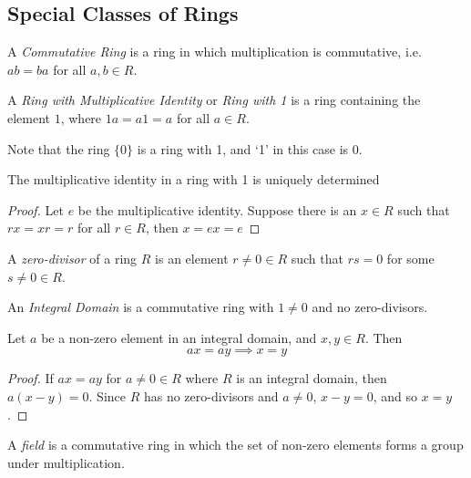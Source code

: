   \subsection{Special Classes of Rings}

  \begin{Def}
    A \emph{Commutative Ring} is a ring in which multiplication is commutative,
    i.e. $ab = ba$ for all $a, b \in R$.
  \end{Def}

  \begin{Def}
    A \emph{Ring with Multiplicative Identity} or \emph{Ring with 1} is
    a ring containing the element $1$, where $1a = a1 = a$ for all
    $a \in R$.
  \end{Def}

  Note that the ring $\lbrace 0 \rbrace$ is a ring with 1, and `1' in this case is $0$.

  \begin{Lemma}
    The multiplicative identity in a ring with 1 is uniquely determined
  \end{Lemma}
  \begin{proof}
    Let $e$ be the multiplicative identity. Suppose there is an $x \in R$ such
    that $rx = xr = r$ for all $r \in R$, then $x = ex = e$
  \end{proof}

  \begin{Def}
    A \emph{zero-divisor} of a ring $R$ is an element $r \neq 0 \in R$ such
    that $rs = 0$ for some $s \neq 0 \in R$.
  \end{Def}

  \begin{Def}
    An \emph{Integral Domain} is a commutative ring with $1 \neq 0$ and no zero-divisors.
  \end{Def}

  \begin{Lemma}
    Let $a$ be a non-zero element in an integral domain, and $x, y \in R$. Then
    $$ax = ay \implies x = y$$
  \end{Lemma}

  \begin{proof}
    If $ax = ay$ for $a \neq 0 \in R$ where $R$ is an integral domain, then
    $a(x-y) = 0$. Since $R$ has no zero-divisors and $a \neq 0$, $x-y = 0$,
    and so $x = y$.
  \end{proof}

  \begin{Def}
    A \emph{field} is a commutative ring in which the set of non-zero elements
    forms a group under multiplication.
  \end{Def}

